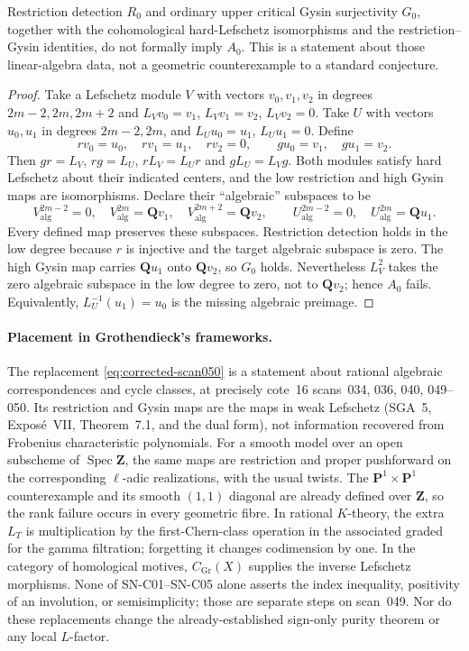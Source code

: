 \begin{proposition}
\label{prop:formal-critical-obstruction}
Restriction detection $R_0$ and ordinary upper critical Gysin
surjectivity $G_0$, together with the cohomological hard-Lefschetz
isomorphisms and the restriction--Gysin identities, do not formally
imply $A_0$.  This is a statement about those linear-algebra data,
not a geometric counterexample to a standard conjecture.
\end{proposition}
\begin{proof}
Take a Lefschetz module $V$ with vectors $v_0,v_1,v_2$ in degrees
$2m-2,2m,2m+2$ and $L_Vv_0=v_1$, $L_Vv_1=v_2$, $L_Vv_2=0$.
Take $U$ with vectors $u_0,u_1$ in degrees $2m-2,2m$, and
$L_Uu_0=u_1$, $L_Uu_1=0$.  Define
\[
 rv_0=u_0,\quad rv_1=u_1,\quad rv_2=0,
 \qquad gu_0=v_1,\quad gu_1=v_2.
\]
Then $gr=L_V$, $rg=L_U$, $rL_V=L_Ur$ and $gL_U=L_Vg$.
Both modules satisfy hard Lefschetz about their indicated centers,
and the low restriction and high Gysin maps are isomorphisms.
Declare their ``algebraic'' subspaces to be
\[
 V_{\mathrm{alg}}^{2m-2}=0,\quad
 V_{\mathrm{alg}}^{2m}=\mathbf Qv_1,\quad
 V_{\mathrm{alg}}^{2m+2}=\mathbf Qv_2,
 \qquad
 U_{\mathrm{alg}}^{2m-2}=0,\quad
 U_{\mathrm{alg}}^{2m}=\mathbf Qu_1.
\]
Every defined map preserves these subspaces.  Restriction detection
holds in the low degree because $r$ is injective and the target
algebraic subspace is zero.  The high Gysin map carries
$\mathbf Qu_1$ onto $\mathbf Qv_2$, so $G_0$ holds.  Nevertheless
$L_V^2$ takes the zero algebraic subspace in the low degree to zero,
not to $\mathbf Qv_2$; hence $A_0$ fails.  Equivalently,
$L_U^{-1}(u_1)=u_0$ is the missing algebraic preimage.
\end{proof}

\paragraph{Placement in Grothendieck's frameworks.}
The replacement \eqref{eq:corrected-scan050} is a statement about
rational algebraic correspondences and cycle classes, at precisely
cote~16 scans~034, 036, 040, 049--050.  Its restriction and Gysin
maps are the maps in weak Lefschetz (SGA~5, Expos\'e~VII,
Theorem~7.1, and the dual form), not information recovered from
Frobenius characteristic polynomials.  For a smooth model over an
open subscheme of $\operatorname{Spec}\mathbf Z$, the same maps
are restriction and proper pushforward on the corresponding
\(\ell\)-adic realizations, with the usual twists.  The
$\mathbf P^1\times\mathbf P^1$ counterexample and its smooth
$(1,1)$ diagonal are already defined over $\mathbf Z$, so the
rank failure occurs in every geometric fibre.  In rational
$K$-theory, the extra $L_T$ is multiplication by the first-Chern-class
operation in the associated graded for the gamma filtration;
forgetting it changes codimension by one.  In the category of
homological motives, $C_{\mathrm{Gr}}(X)$ supplies the inverse
Lefschetz morphisms.  None of SN-C01--SN-C05 alone asserts the
index inequality, positivity of an involution, or semisimplicity;
those are separate steps on scan~049.  Nor do these replacements
change the already-established sign-only purity theorem or any
local $L$-factor.
